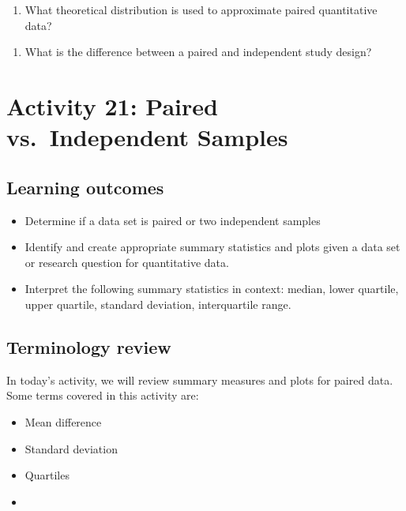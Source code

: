 \documentclass[
]{report}
\providecommand{\tightlist}{%
  \setlength{\itemsep}{0pt}\setlength{\parskip}{0pt}}
\begin{document}
\begin{enumerate}
\def\labelenumi{\arabic{enumi}.}
\tightlist
\item
  What theoretical distribution is used to approximate paired quantitative data?
\end{enumerate}

\vspace{0.2in}

\begin{enumerate}
\def\labelenumi{\arabic{enumi}.}
\setcounter{enumi}{1}
\tightlist
\item
  What is the difference between a paired and independent study design?
\end{enumerate}

\vspace{1in}

\newpage

\section{Activity 21: Paired vs.~Independent Samples}\label{activity-21-paired-vs.-independent-samples}


\subsection{Learning outcomes}\label{learning-outcomes-23}

\begin{itemize}
\item
  Determine if a data set is paired or two independent samples
\item
  Identify and create appropriate summary statistics and plots
  given a data set or research question for quantitative data.
\item
  Interpret the following summary statistics in context:
  median, lower quartile, upper quartile,
  standard deviation, interquartile range.
\end{itemize}

\subsection{Terminology review}\label{terminology-review-18}

In today's activity, we will review summary measures and plots for paired data. Some terms covered in this activity are:

\begin{itemize}
\item
  Mean difference
\item
  Standard deviation
\item
  Quartiles
\item
\end{itemize}
\end{document}

